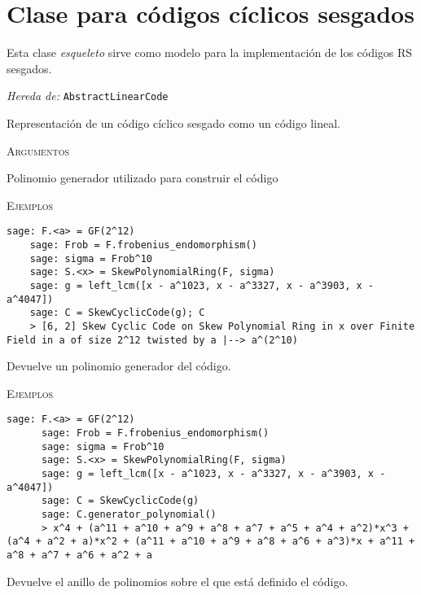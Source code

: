\section{Clase para códigos cíclicos sesgados}

Esta clase \emph{esqueleto} sirve como modelo para la implementación de los códigos RS sesgados.

\begin{description}[leftmargin=1em, font=\normalfont\ttfamily, style=nextline]
  \item[class SkewCyclicCode(self, generator\_pol=None)]
  
  \emph{Hereda de:} \texttt{AbstractLinearCode}

  Representación de un código cíclico sesgado como un código lineal.

  \textsc{Argumentos}
  \begin{description}[font=\normalfont\ttfamily]
    \item[generator\_pol] Polinomio generador utilizado para construir el código
  \end{description}

  \textsc{Ejemplos}
  \begin{lstlisting}[gobble=4]
    sage: F.<a> = GF(2^12)
    sage: Frob = F.frobenius_endomorphism()
    sage: sigma = Frob^10
    sage: S.<x> = SkewPolynomialRing(F, sigma)
    sage: g = left_lcm([x - a^1023, x - a^3327, x - a^3903, x - a^4047])
    sage: C = SkewCyclicCode(g); C
    > [6, 2] Skew Cyclic Code on Skew Polynomial Ring in x over Finite Field in a of size 2^12 twisted by a |--> a^(2^10)
  \end{lstlisting}

  \begin{description}[font=\ttfamily, style=nextline]
    \item[generator\_polynomial()] Devuelve un polinomio generador del código.
    
    \textsc{Ejemplos}
    \begin{lstlisting}[gobble=6]
      sage: F.<a> = GF(2^12)
      sage: Frob = F.frobenius_endomorphism()
      sage: sigma = Frob^10
      sage: S.<x> = SkewPolynomialRing(F, sigma)
      sage: g = left_lcm([x - a^1023, x - a^3327, x - a^3903, x - a^4047])
      sage: C = SkewCyclicCode(g)
      sage: C.generator_polynomial()
      > x^4 + (a^11 + a^10 + a^9 + a^8 + a^7 + a^5 + a^4 + a^2)*x^3 + (a^4 + a^2 + a)*x^2 + (a^11 + a^10 + a^9 + a^8 + a^6 + a^3)*x + a^11 + a^8 + a^7 + a^6 + a^2 + a
    \end{lstlisting}
    \item[polynomial\_ring()] Devuelve el anillo de polinomios sobre el que está definido el código.
     

\end{description}
\end{description}
